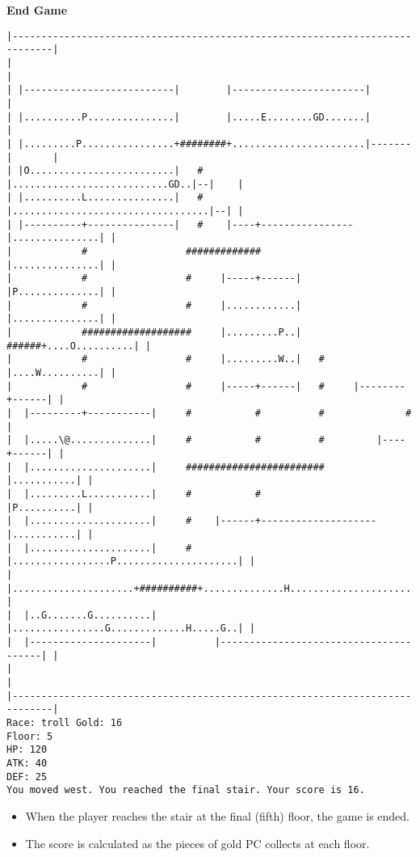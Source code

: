 \documentclass[11pt]{article}
\theoremstyle{plain}
\begin{document}
\textbf{End Game}
\newpage

\begin{Verbatim}[fontsize=\scriptsize]
|-----------------------------------------------------------------------------|
|                                                                             |
| |--------------------------|        |-----------------------|               |
| |..........P...............|        |.....E........GD.......|               |
| |.........P................+########+.......................|-------|       |
| |O.........................|   #    |...........................GD..|--|    |
| |..........L...............|   #    |..................................|--| |
| |----------+---------------|   #    |----+----------------|...............| |
|            #                 #############                |...............| |
|            #                 #     |-----+------|         |P..............| |
|            #                 #     |............|         |...............| |
|            ###################     |.........P..|   ######+....O..........| |
|            #                 #     |.........W..|   #     |....W..........| |
|            #                 #     |-----+------|   #     |--------+------| |
|  |---------+-----------|     #           #          #              #        |
|  |.....\@..............|     #           #          #         |----+------| |
|  |.....................|     ########################         |...........| |
|  |.........L...........|     #           #                    |P..........| |
|  |.....................|     #    |------+--------------------|...........| |
|  |.....................|     #    |.................P.....................| |
|  |.....................+##########+..............H........................| |
|  |..G.......G..........|          |................G.............H.....G..| |
|  |---------------------|          |---------------------------------------| |
|                                                                             |
|-----------------------------------------------------------------------------|
Race: troll Gold: 16                                                   Floor: 5
HP: 120
ATK: 40
DEF: 25
You moved west. You reached the final stair. Your score is 16.  
\end{Verbatim}

\begin{itemize}
    \item When the player reaches the stair at the final (fifth) floor, the game
    is ended.
    \item The score is calculated as the pieces of gold PC collects at each floor.
\end{itemize}
\end{document}
